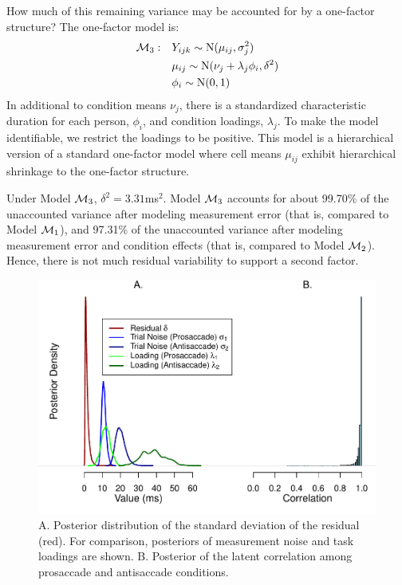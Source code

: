 \documentclass[
  ,man,floatsintext]{apa6}
\begin{document}
How much of this remaining variance may be accounted for by a one-factor structure? The one-factor model is:
\[ \begin{aligned}
{\cal M}_3:\quad & Y_{ijk} \sim \mbox{N}(\mu_{ij},\sigma_j^2)\\
&\mu_{ij} \sim \mbox{N}(\nu_j+\lambda_j\phi_i,\delta^2)\\
&\phi_i\sim\mbox{N}(0,1)
\end{aligned}
\]
In additional to condition means \(\nu_j\), there is a standardized characteristic duration for each person, \(\phi_i\), and condition loadings, \(\lambda_j\). To make the model identifiable, we restrict the loadings to be positive. This model is a hierarchical version of a standard one-factor model where cell means \(\mu_{ij}\) exhibit hierarchical shrinkage to the one-factor structure.

Under Model \({\cal M}_3\), \(\delta^2= 3.31\)ms\(^2\). Model \({\cal M}_3\) accounts for about 99.70\% of the unaccounted variance after modeling measurement error (that is, compared to Model \({\cal M}_1\)), and 97.31\% of the unaccounted variance after modeling measurement error and condition effects (that is, compared to Model \({\cal M}_2\)). Hence, there is not much residual variability to support a second factor.

\begin{figure}
\centering
\includegraphics{p_files/figure-latex/mod3-1.pdf}
\caption{\label{fig:mod3}A. Posterior distribution of the standard deviation of the residual (red). For comparison, posteriors of measurement noise and task loadings are shown. B. Posterior of the latent correlation among prosaccade and antisaccade conditions.}
\end{figure}
\end{document}
